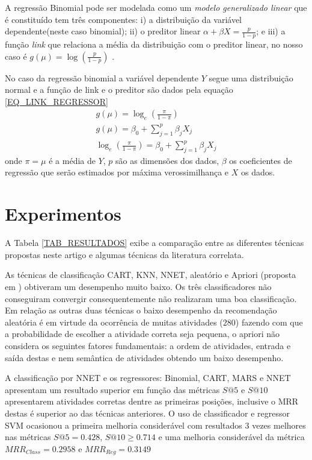 \documentclass{acm_proc_article-sp}
\begin{document}
A regress{\~a}o Binomial pode ser modelada como um \emph{modelo generalizado linear} que {\'e} constitu{\'i}do tem tr{\^e}s componentes: i) a distribui\c{c}{\~a}o da vari{\'a}vel dependente(neste caso binomial); ii) o preditor linear \(\alpha + \beta X = \frac{p}{1 - p} \); e iii) a fun\c{c}{\~a}o \emph{link} que relaciona a m{\'e}dia da distribui\c{c}{\~a}o com o preditor linear, no nosso caso {\'e} \(g(\mu) = \log(\frac{p}{1-p})\) \cite{Hastie2009}.

No caso da regress{\~a}o binomial a vari{\'a}vel dependente \(Y\) segue uma distribui\c{c}{\~a}o normal e a fun\c{c}{\~a}o de link e o preditor s{\~a}o dados pela equa\c{c}{\~a}o \eqref{EQ_LINK_REGRESSOR}
\begin{align}
g(\mu) = \log_{e}\left( \frac{\pi}{1-\pi}\right) \\
g(\mu) = \beta_{0} + \sum\limits_{j=1}^{p} \beta_{j}X_{j} \\
\log_{e}\left( \frac{\pi}{1-\pi}\right)= \beta_{0} + \sum\limits_{j=1}^{p} \beta_{j}X_{j} \label{EQ_LINK_REGRESSOR}
\end{align}
onde \(\pi = \mu\) {\'e} a m{\'e}dia de \(Y\), \(p\) s{\~a}o as dimens{\~o}es dos dados, \(\beta\) os coeficientes de regress{\~a}o que ser{\~a}o estimados por m{\'a}xima verossimilhan\c{c}a e \(X\) os dados.

\section{Experimentos}\label{EXPERIMENTOS}
A Tabela \ref{TAB_RESULTADOS} exibe a compara\c{c}{\~a}o entre as diferentes t{\'e}cnicas propostas neste artigo e algumas t{\'e}cnicas da literatura correlata.

As t{\'e}cnicas de classifica\c{c}{\~a}o CART, KNN, NNET, aleat{\'o}rio e Apriori (proposta em \cite{Tan2011, Wang2009}) obtiveram um desempenho muito baixo. Os tr{\^e}s classificadores n{\~a}o conseguiram convergir consequentemente n{\~a}o realizaram uma boa classifica\c{c}{\~a}o. Em rela\c{c}{\~a}o as outras duas t{\'e}cnicas o baixo desempenho da recomenda\c{c}{\~a}o aleat{\'o}ria {\'e} em virtude da ocorr{\^e}ncia de muitas atividades (\(280\)) fazendo com que a probabilidade de escolher a atividade correta seja pequena, o apriori n{\~a}o considera os seguintes fatores fundamentais: a ordem de atividades, entrada e sa{\'i}da destas e nem sem{\^a}ntica de atividades obtendo um baixo desempenho.

A classifica\c{c}{\~a}o por NNET e os regressores: Binomial, CART, MARS e NNET apresentam um resultado superior em fun\c{c}{\~a}o das m{\'e}tricas \(S@5\) e \(S@10\) apresentarem atividades corretas dentre as primeiras posi\c{c}{\~o}es, inclusive o MRR destas {\'e} superior ao das t{\'e}cnicas anteriores. O uso de classificador e regressor SVM ocasionou a primeira melhoria consider{\'a}vel com resultados \(3\) vezes melhores nas m{\'e}tricas \(S@5 = 0.428\), \(S@10 \geq 0.714\) e uma melhoria consider{\'a}vel da m{\'e}trica \(MRR_{Class} = 0.2958\) e \(MRR_{Reg} = 0.3149\)
\end{document}
